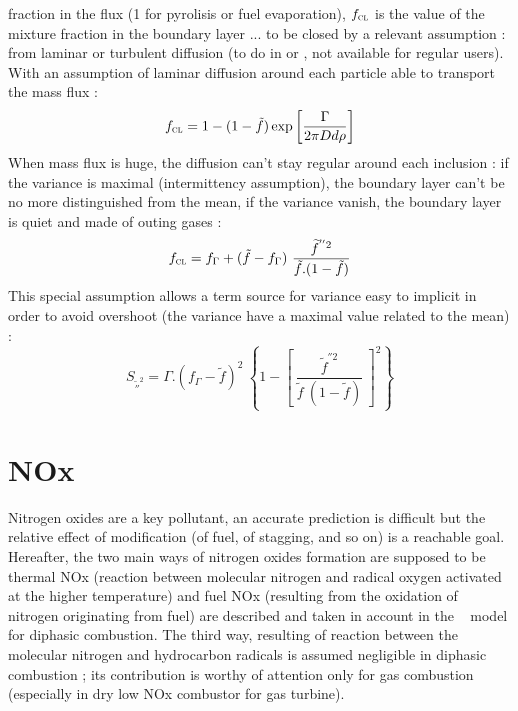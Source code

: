 fraction in the flux (1 for pyrolisis or fuel evaporation),
$f_{\mbox{\scriptsize\textsc{cl}}}$ is the value of the mixture fraction in the
boundary layer ... to be closed by a relevant assumption : from laminar or
turbulent diffusion (to do in  or
, not available for regular users).\\
With an assumption of laminar diffusion around each particle able to transport
the mass flux :
\begin{equation}
\displaystyle f_{\mbox{\scriptsize\textsc{cl}}} =  1 - (1-\tilde f)\exp \left[\displaystyle \frac{\Gamma}{2 \pi D d \rho}\right]
\end{equation} 
When mass flux is huge, the diffusion can't stay regular around each inclusion :
if the variance is maximal (intermittency assumption), the boundary layer can't
be no more distinguished from the mean, if the variance vanish, the boundary
layer is quiet and made of outing gases :
\begin{equation}
\displaystyle f_{\mbox{\scriptsize\textsc{cl}}} = f_{\Gamma} + (\tilde f  - f_{\Gamma}) ~ \frac{\widetilde f^{''2}}{\tilde f .(1-\tilde f)}
\end{equation} 
This special assumption allows a term source for variance easy to implicit in order to avoid overshoot (the variance have a maximal value related to the mean) :
\begin{equation}
\displaystyle S_{\widetilde ''^{2}} = \Gamma .\left( f_{\Gamma}-\tilde f\right)^{2} ~ \left\{ 1-\left[~ \frac{\widetilde f^{''2}}{\tilde f ~(1-\tilde f)}~\right]^{\textstyle2}\right\}
\end{equation}


\section{NOx}

Nitrogen oxides are a key pollutant, an accurate prediction is difficult but the
relative effect of modification (of fuel, of stagging, and so on) is a reachable
goal.
Hereafter, the two main ways of nitrogen oxides formation are supposed to
be thermal NOx (reaction between molecular nitrogen and radical oxygen activated
at the higher temperature) and fuel NOx (resulting from the oxidation of
nitrogen originating from fuel) are described and taken in account in the \CS~
model for diphasic combustion. The third way, resulting of reaction between the
molecular nitrogen and hydrocarbon radicals is assumed negligible in diphasic
combustion ; its contribution is worthy of attention only for gas combustion
(especially in dry
low NOx combustor for gas turbine).\\

